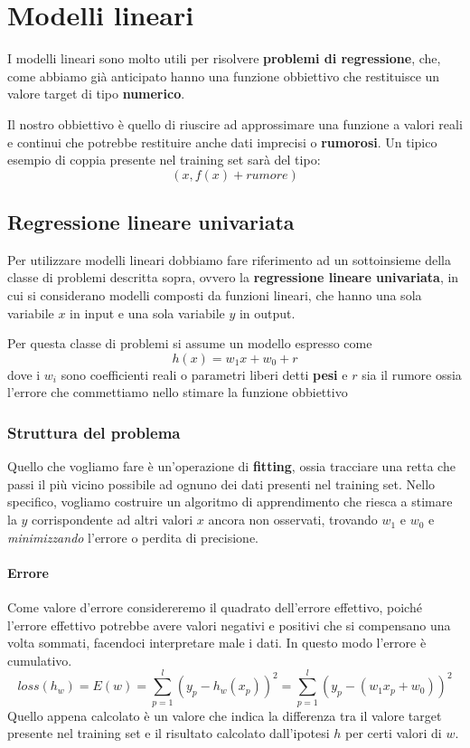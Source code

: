 \chapter{Modelli lineari}
I modelli lineari sono molto utili per risolvere \textbf{problemi di regressione}, che, come abbiamo gi\`a anticipato
hanno una funzione obbiettivo che restituisce un valore target di tipo \textbf{numerico}.

Il nostro obbiettivo \`e quello di riuscire ad approssimare una funzione a valori reali e continui che potrebbe restituire
anche dati imprecisi o \textbf{rumorosi}. Un tipico esempio di coppia presente nel training set sar\`a del tipo:
\[ (x, f(x) + rumore) \]

\section{Regressione lineare univariata}
Per utilizzare modelli lineari dobbiamo fare riferimento ad un sottoinsieme della classe di problemi descritta sopra, ovvero
la \textbf{regressione lineare univariata}, in cui si considerano modelli composti da funzioni lineari, che hanno una sola
variabile $x$ in input e una sola variabile $y$ in output.

Per questa classe di problemi si assume un modello espresso come
\[ h(x) = w_1 x + w_0 + r \]
dove i $w_i$ sono coefficienti reali o parametri liberi detti \textbf{pesi} e $r$ sia il rumore ossia l'errore che
commettiamo nello stimare la funzione obbiettivo

\subsection{Struttura del problema}
Quello che vogliamo fare \`e un'operazione di \textbf{fitting}, ossia tracciare una retta che passi il pi\`u vicino
possibile ad ognuno dei dati presenti nel training set. Nello specifico, vogliamo costruire un algoritmo di apprendimento
che riesca a stimare la $y$ corrispondente ad altri valori $x$ ancora non osservati, trovando $w_1$ e $w_0$ e
\emph{minimizzando} l'errore o perdita di precisione.

\subsubsection{Errore}
Come valore d'errore considereremo il quadrato dell'errore effettivo, poich\'e l'errore effettivo potrebbe avere valori
negativi e positivi che si compensano una volta sommati, facendoci interpretare male i dati. In questo modo l'errore \`e
cumulativo.
\[ loss(h_w) = E(w) = \sum_{p=1}^l (y_p - h_w(x_p))^2 = \sum_{p=1}^l (y_p - (w_1 x_p + w_0))^2 \]
Quello appena calcolato \`e un valore che indica la differenza tra il valore target presente nel training set e
il risultato calcolato dall'ipotesi $h$ per certi valori di $w$.

